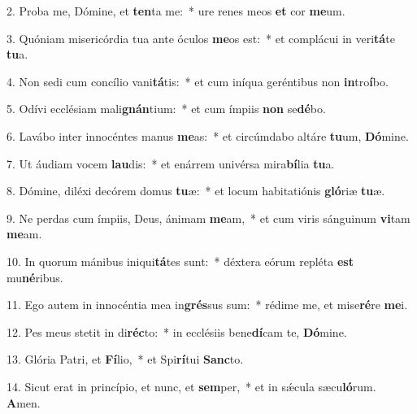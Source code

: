 2. Proba me, Dómine, et \textbf{ten}ta me:~*  ure renes meos \textbf{et} cor \textbf{me}um.\

3. Quóniam misericórdia tua ante óculos \textbf{me}os est:~*  et complácui in veri\textbf{tá}te \textbf{tu}a.\

4. Non sedi cum concílio vani\textbf{tá}tis:~*  et cum iníqua geréntibus non \textbf{in}tro\textbf{í}bo.\

5. Odívi ecclésiam mali\textbf{gnán}tium:~*  et cum ímpiis \textbf{non} se\textbf{dé}bo.\

6. Lavábo inter innocéntes manus \textbf{me}as:~*  et circúmdabo altáre \textbf{tu}um, \textbf{Dó}mine.\

7. Ut áudiam vocem \textbf{lau}dis:~*  et enárrem univérsa mira\textbf{bí}lia \textbf{tu}a.\

8. Dómine, diléxi decórem domus \textbf{tu}æ:~*  et locum habitatiónis \textbf{gló}riæ \textbf{tu}æ.\

9. Ne perdas cum ímpiis, Deus, ánimam \textbf{me}am,~*  et cum viris sánguinum \textbf{vi}tam \textbf{me}am.\

10. In quorum mánibus iniqui\textbf{tá}tes sunt:~*  déxtera eórum repléta \textbf{est} mu\textbf{né}ribus.\

11. Ego autem in innocéntia mea in\textbf{grés}sus sum:~*  rédime me, et mise\textbf{ré}re \textbf{me}i.\

12. Pes meus stetit in di\textbf{réc}to:~*  in ecclésiis bene\textbf{dí}cam te, \textbf{Dó}mine.\

13. Glória Patri, et \textbf{Fí}lio,~*  et Spi\textbf{rí}tui \textbf{Sanc}to.\

14. Sicut erat in princípio, et nunc, et \textbf{sem}per,~*  et in sǽcula sæcu\textbf{ló}rum. \textbf{A}men.\

